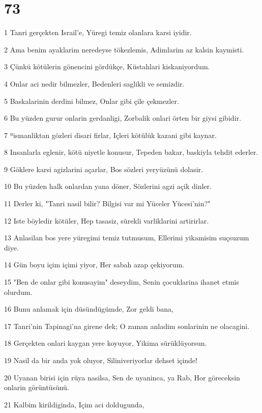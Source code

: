 \chapter{73}

\par 1 Tanri gerçekten Israil'e, Yüregi temiz olanlara karsi iyidir.
\par 2 Ama benim ayaklarim neredeyse tökezlemis, Adimlarim az kalsin kaymisti.
\par 3 Çünkü kötülerin gönencini gördükçe, Küstahlari kiskaniyordum.
\par 4 Onlar aci nedir bilmezler, Bedenleri saglikli ve semizdir.
\par 5 Baskalarinin derdini bilmez, Onlar gibi çile çekmezler.
\par 6 Bu yüzden gurur onlarin gerdanligi, Zorbalik onlari örten bir giysi gibidir.
\par 7 ªismanliktan gözleri disari firlar, Içleri kötülük kazani gibi kaynar.
\par 8 Insanlarla eglenir, kötü niyetle konusur, Tepeden bakar, baskiyla tehdit ederler.
\par 9 Göklere karsi agizlarini açarlar, Bos sözleri yeryüzünü dolasir.
\par 10 Bu yüzden halk onlardan yana döner, Sözlerini agzi açik dinler.
\par 11 Derler ki, "Tanri nasil bilir? Bilgisi var mi Yüceler Yücesi'nin?"
\par 12 Iste böyledir kötüler, Hep tasasiz, sürekli varliklarini artirirlar.
\par 13 Anlasilan bos yere yüregimi temiz tutmusum, Ellerimi yikamisim suçsuzum diye.
\par 14 Gün boyu içim içimi yiyor, Her sabah azap çekiyorum.
\par 15 "Ben de onlar gibi konusayim" deseydim, Senin çocuklarina ihanet etmis olurdum.
\par 16 Bunu anlamak için düsündügümde, Zor geldi bana,
\par 17 Tanri'nin Tapinagi'na girene dek; O zaman anladim sonlarinin ne olacagini.
\par 18 Gerçekten onlari kaygan yere koyuyor, Yikima sürüklüyorsun.
\par 19 Nasil da bir anda yok oluyor, Siliniveriyorlar dehset içinde!
\par 20 Uyanan birisi için rüya nasilsa, Sen de uyaninca, ya Rab, Hor göreceksin onlarin görüntüsünü.
\par 21 Kalbim kirildiginda, Içim aci doldugunda,
